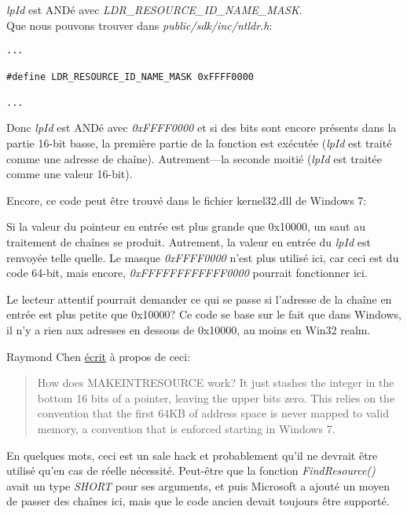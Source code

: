 \emph{lpId} est ANDé avec \emph{LDR\_RESOURCE\_ID\_NAME\_MASK}. \\
 Que nous pouvons trouver dans \emph{public/sdk/inc/ntldr.h}:

\begin{lstlisting}[style=customc]
...

#define LDR_RESOURCE_ID_NAME_MASK 0xFFFF0000

...
\end{lstlisting}

Donc \emph{lpId} est ANDé avec \emph{0xFFFF0000} et si des bits sont encore présents
dans la partie 16-bit basse, la première partie de la fonction est exécutée (\emph{lpId} 
est traité comme une adresse de chaîne).
Autrement---la seconde moitié (\emph{lpId} est traitée comme une valeur 16-bit).

Encore, ce code peut être trouvé dans le fichier kernel32.dll de Windows 7:



Si la valeur du pointeur en entrée est plus grande que 0x10000, un saut au traitement
de chaînes se produit.
Autrement, la valeur en entrée du \emph{lpId} est renvoyée telle quelle.
Le masque \emph{0xFFFF0000} n'est plus utilisé ici, car ceci est du code 64-bit, mais
encore, \emph{0xFFFFFFFFFFFF0000} pourrait fonctionner ici.

Le lecteur attentif pourrait demander ce qui se passe si l'adresse de la chaîne en
entrée est plus petite que 0x10000?
Ce code se base sur le fait que dans Windows, il n'y a rien aux adresses en dessous
de 0x10000, au moins en Win32 realm.

Raymond Chen \href{https://blogs.msdn.microsoft.com/oldnewthing/20130925-00/?p=3123}{écrit} à propos de ceci:

\begin{framed}
\begin{quotation}
How does MAKE­INT­RESOURCE work? It just stashes the integer in the bottom 16 bits of a pointer, leaving the upper bits zero. This relies on the convention that the first 64KB of address space is never mapped to valid memory, a convention that is enforced starting in Windows 7.
\end{quotation}
\end{framed}

En quelques mots, ceci est un sale hack et probablement qu'il ne devrait être utilisé
qu'en cas de réelle nécessité.
Peut-être que la fonction \emph{FindResource()} avait un type \emph{SHORT} pour ses arguments,
et puis Microsoft a ajouté un moyen de passer des chaînes ici, mais que le code ancien
devait toujours être supporté.

